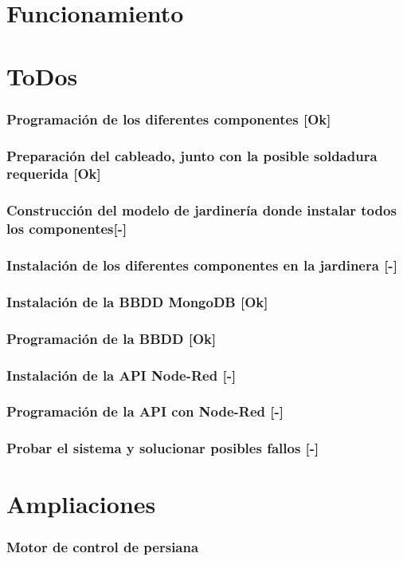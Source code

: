\documentclass[12pt,a4paper,titlepage,oneside]{report}
\begin{document}
\chapter{Funcionamiento}


\chapter{ToDos}

	\subsection*{Programación de los diferentes componentes [Ok]}
	
	\subsection*{Preparación del cableado, junto con la posible soldadura requerida [Ok]}
	
	\subsection*{Construcción del modelo de jardinería donde instalar todos los componentes[-]}
	
	\subsection*{Instalación de los diferentes componentes en la jardinera [-]}
	
	\subsection*{Instalación de la BBDD MongoDB [Ok]}
	
	\subsection*{Programación de la BBDD [Ok]}
	
	\subsection*{Instalación de la API Node-Red [-]}
	
	\subsection*{Programación de la API con Node-Red [-]}
	
	\subsection*{Probar el sistema y solucionar posibles fallos [-]}

\chapter{Ampliaciones}

	\subsection*{Motor de control de persiana}
	
\end{document}
